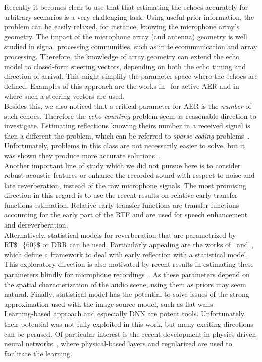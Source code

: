 Recently it becomes clear to use that that estimating the echoes accurately for arbitrary scenarios is a very challenging task.
Using useful prior information, the problem can be easily relaxed, for instance, knowing the microphone array's geometry.
The impact of the microphone array (and antenna) geometry is well studied in signal processing communities, such as in telecommunication and array processing.
Therefore, the knowledge of array geometry can extend the echo model to closed-form steering vectors, depending on both the echo timing and direction of arrival.
This might simplify the parameter space where the echoes are defined.
Examples of this approach are the works in~ for active \acf{AER} and in  where such a steering vectors are used.
\\Besides this, we also noticed that a critical parameter for \ac{AER} is the \textit{number} of such echoes.
Therefore the \textit{echo counting} problem seem as reasonable direction to investigate.
Estimating reflections knowing theirs number in a received signal is then a different the problem, which can be  referred to \textit{sparse coding} problems~.
Unfortunately, problems in this class are not necessarily easier to solve, but it was shown they produce more accurate solutions~.
\\Another important line of study which we did not pursue here is to consider robust acoustic features or enhance the recorded sound with respect to noise and late reverberation, instead of the raw microphone signals.
The most promising direction in this regard is to use the recent results on relative early transfer functions estimation.
Relative early transfer functions are transfer functions accounting for the early part of the \ac{RTF} and are used for speech enhancement and dereverberation.
\\Alternatively, statistical models for reverberation that are parametrized by \ac{RT$_{60}$} or \acf{DRR} can be used.
Particularly appealing are the works of~\citeauthor{leglaive2015multichannel} and~\citeauthor{badeau2019common}, which define a framework to deal with early reflection with a statistical model.
This exploratory direction is also motivated by recent results in estimating these parameters blindly for microphone recordings~.
As these parameters depend on the spatial characterization of the audio scene, using them as priors may seem natural.
Finally, statistical model has the potential to solve issues of the strong approximation used with the image source model, such as flat walls.
\\Learning-based approach and especially \acf{DNN} are potent tools.
Unfortunately, their potential was not fully exploited in this work, but many exciting directions can be perused.
Of particular interest is the recent development in physics-driven neural networks~,
where physical-based layers and regularized are used to facilitate the learning.


